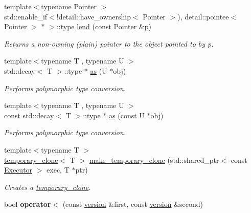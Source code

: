 \begin{DoxyCompactItemize}
{\footnotesize template$<$typename Pointer $>$ }\\std\+::enable\+\_\+if$<$!detail\+::have\+\_\+ownership$<$ Pointer $>$), detail\+::pointee$<$ Pointer $>$ $\ast$ $>$\+::type \hyperlink{namespacegko_aa0c1deeb105cfb5a635b5f41cb5e8321}{lend} (const Pointer \&p)
\begin{DoxyCompactList}\small\item\em Returns a non-\/owning (plain) pointer to the object pointed to by {\ttfamily p}. \end{DoxyCompactList}\item 
{\footnotesize template$<$typename T , typename U $>$ }\\std\+::decay$<$ T $>$\+::type $\ast$ \hyperlink{namespacegko_a73ce7e87aec389b5210630bb617b4baa}{as} (U $\ast$obj)
\begin{DoxyCompactList}\small\item\em Performs polymorphic type conversion. \end{DoxyCompactList}\item 
{\footnotesize template$<$typename T , typename U $>$ }\\const std\+::decay$<$ T $>$\+::type $\ast$ \hyperlink{namespacegko_a289e84ef5dea2f579dd12f27140a1470}{as} (const U $\ast$obj)
\begin{DoxyCompactList}\small\item\em Performs polymorphic type conversion. \end{DoxyCompactList}\item 
{\footnotesize template$<$typename T $>$ }\\\hyperlink{classgko_1_1temporary__clone}{temporary\+\_\+clone}$<$ T $>$ \hyperlink{namespacegko_aa9c0782fb35cc18cb404716d9b6f2c0e}{make\+\_\+temporary\+\_\+clone} (std\+::shared\+\_\+ptr$<$ const \hyperlink{classgko_1_1Executor}{Executor} $>$ exec, T $\ast$ptr)
\begin{DoxyCompactList}\small\item\em Creates a \hyperlink{classgko_1_1temporary__clone}{temporary\+\_\+clone}. \end{DoxyCompactList}\item 
\mbox{\label{namespacegko_a70e5d651d3fc23e6ed48980efd2098d3}} 
bool {\bfseries operator$<$} (const \hyperlink{structgko_1_1version}{version} \&first, const \hyperlink{structgko_1_1version}{version} \&second)
\item 
\mbox{\label{namespacegko_aa3a749f76b73c3b0e161e2019ad12308}} 

\end{DoxyCompactItemize}
